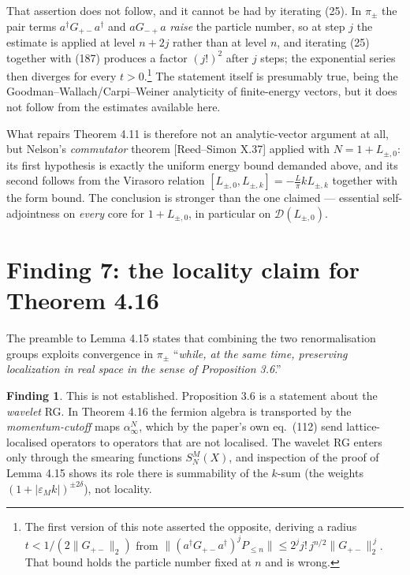 \documentclass[11pt,a4paper]{article}
\theoremstyle{definition}
\newtheorem{finding}{Finding}
\newcommand{\eps}{\varepsilon}
\begin{document}
That assertion does not follow, and it cannot be had by iterating (25). In $\pi_\pm$ the pair
terms $a^\dagger G_{+-}a^\dagger$ and $aG_{-+}a$ \emph{raise} the particle number, so at step
$j$ the estimate is applied at level $n+2j$ rather than at level $n$, and iterating (25)
together with (187) produces a factor $(j!)^2$ after $j$ steps; the exponential series then
diverges for every $t>0$.\footnote{The first version of this note asserted the opposite,
deriving a radius $t<1/(2\|G_{+-}\|_2)$ from
$\|(a^\dagger G_{+-}a^\dagger)^jP_{\le n}\|\le 2^jj!\,j^{n/2}\|G_{+-}\|_2^{\,j}$. That bound
holds the particle number fixed at $n$ and is wrong.} The statement itself is presumably true,
being the Goodman--Wallach/Carpi--Weiner analyticity of finite-energy vectors, but it does not
follow from the estimates available here.

What repairs Theorem 4.11 is therefore not an analytic-vector argument at all, but Nelson's
\emph{commutator} theorem [Reed--Simon X.37] applied with $N=1+L_{\pm,0}$: its first hypothesis
is exactly the uniform energy bound demanded above, and its second follows from the Virasoro
relation $[L_{\pm,0},L_{\pm,k}]=-\tfrac L\pi kL_{\pm,k}$ together with the form bound. The
conclusion is stronger than the one claimed --- essential self-adjointness on \emph{every} core
for $1+L_{\pm,0}$, in particular on $\mathcal D(L_{\pm,0})$.

\section{Finding 7: the locality claim for Theorem 4.16}

\noindent
The preamble to Lemma 4.15 states that combining the two renormalisation groups exploits
convergence in $\pi_\pm$ ``\emph{while, at the same time, preserving localization in real space
in the sense of Proposition 3.6}.''

\begin{finding}
This is not established. Proposition 3.6 is a statement about the \emph{wavelet} RG. In
Theorem 4.16 the fermion algebra is transported by the \emph{momentum-cutoff} maps
$\alpha^N_\infty$, which by the paper's own eq.~(112) send lattice-localised operators to
operators that are not localised. The wavelet RG enters only through the smearing functions
$S^M_N(X)$, and inspection of the proof of Lemma 4.15 shows its role there is summability of
the $k$-sum (the weights $(1+|\eps_Mk|)^{\pm2\delta}$), not locality.
\end{finding}
\end{document}
